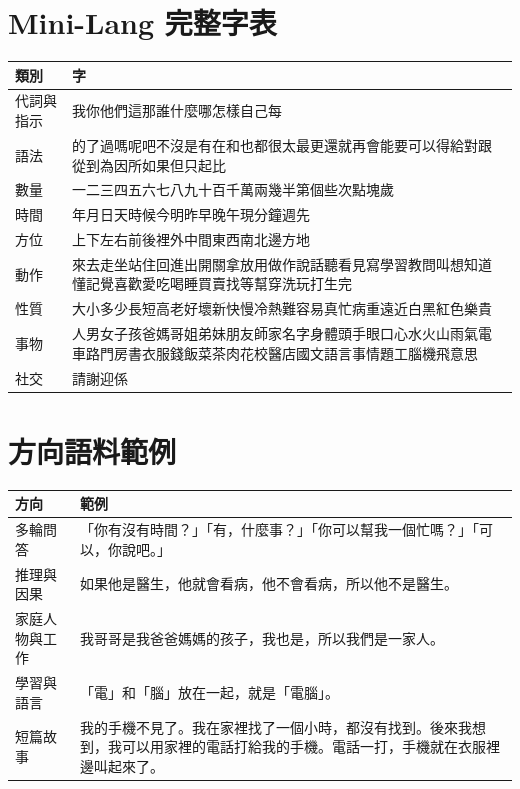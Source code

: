 \documentclass[11pt,a4paper]{article}
\begin{document}
\appendix
\section{Mini-Lang 完整字表}\label{app:charset}

\begin{tabularx}{\linewidth}{lY}
\toprule
類別 & 字 \\
\midrule
代詞與指示 & 我你他們這那誰什麼哪怎樣自己每 \\
語法 & 的了過嗎呢吧不沒是有在和也都很太最更還就再會能要可以得給對跟從到為因所如果但只起比 \\
數量 & 一二三四五六七八九十百千萬兩幾半第個些次點塊歲 \\
時間 & 年月日天時候今明昨早晚午現分鐘週先 \\
方位 & 上下左右前後裡外中間東西南北邊方地 \\
動作 & 來去走坐站住回進出開關拿放用做作說話聽看見寫學習教問叫想知道懂記覺喜歡愛吃喝睡買賣找等幫穿洗玩打生完 \\
性質 & 大小多少長短高老好壞新快慢冷熱難容易真忙病重遠近白黑紅色樂貴 \\
事物 & 人男女子孩爸媽哥姐弟妹朋友師家名字身體頭手眼口心水火山雨氣電車路門房書衣服錢飯菜茶肉花校醫店國文語言事情題工腦機飛意思 \\
社交 & 請謝迎係 \\
\bottomrule
\end{tabularx}

\section{方向語料範例}

\begin{tabularx}{\linewidth}{lY}
\toprule
方向 & 範例 \\
\midrule
多輪問答 & 「你有沒有時間？」「有，什麼事？」「你可以幫我一個忙嗎？」「可以，你說吧。」 \\
推理與因果 & 如果他是醫生，他就會看病，他不會看病，所以他不是醫生。 \\
家庭人物與工作 & 我哥哥是我爸爸媽媽的孩子，我也是，所以我們是一家人。 \\
學習與語言 & 「電」和「腦」放在一起，就是「電腦」。 \\
短篇故事 & 我的手機不見了。我在家裡找了一個小時，都沒有找到。後來我想到，我可以用家裡的電話打給我的手機。電話一打，手機就在衣服裡邊叫起來了。 \\
\bottomrule
\end{tabularx}
\end{document}
